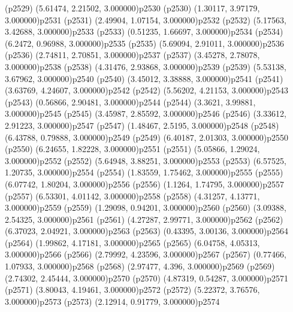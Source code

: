 \psdot(p2529)
\psPoint(5.61474, 2.21502, 3.000000){p2530}
\psdot(p2530)
\psPoint(1.30117, 3.97179, 3.000000){p2531}
\psdot(p2531)
\psPoint(2.49904, 1.07154, 3.000000){p2532}
\psdot(p2532)
\psPoint(5.17563, 3.42688, 3.000000){p2533}
\psdot(p2533)
\psPoint(0.51235, 1.66697, 3.000000){p2534}
\psdot(p2534)
\psPoint(6.2472, 0.96988, 3.000000){p2535}
\psdot(p2535)
\psPoint(5.69094, 2.91011, 3.000000){p2536}
\psdot(p2536)
\psPoint(2.74811, 2.70851, 3.000000){p2537}
\psdot(p2537)
\psPoint(3.45278, 2.78078, 3.000000){p2538}
\psdot(p2538)
\psPoint(4.31476, 2.93868, 3.000000){p2539}
\psdot(p2539)
\psPoint(5.53138, 3.67962, 3.000000){p2540}
\psdot(p2540)
\psPoint(3.45012, 3.38888, 3.000000){p2541}
\psdot(p2541)
\psPoint(3.63769, 4.24607, 3.000000){p2542}
\psdot(p2542)
\psPoint(5.56202, 4.21153, 3.000000){p2543}
\psdot(p2543)
\psPoint(0.56866, 2.90481, 3.000000){p2544}
\psdot(p2544)
\psPoint(3.3621, 3.99881, 3.000000){p2545}
\psdot(p2545)
\psPoint(3.45987, 2.85592, 3.000000){p2546}
\psdot(p2546)
\psPoint(3.33612, 2.91223, 3.000000){p2547}
\psdot(p2547)
\psPoint(1.48467, 2.5195, 3.000000){p2548}
\psdot(p2548)
\psPoint(6.43788, 0.79888, 3.000000){p2549}
\psdot(p2549)
\psPoint(6.40187, 2.01303, 3.000000){p2550}
\psdot(p2550)
\psPoint(6.24655, 1.82228, 3.000000){p2551}
\psdot(p2551)
\psPoint(5.05866, 1.29024, 3.000000){p2552}
\psdot(p2552)
\psPoint(5.64948, 3.88251, 3.000000){p2553}
\psdot(p2553)
\psPoint(6.57525, 1.20735, 3.000000){p2554}
\psdot(p2554)
\psPoint(1.83559, 1.75462, 3.000000){p2555}
\psdot(p2555)
\psPoint(6.07742, 1.80204, 3.000000){p2556}
\psdot(p2556)
\psPoint(1.1264, 1.74795, 3.000000){p2557}
\psdot(p2557)
\psPoint(6.53301, 4.01142, 3.000000){p2558}
\psdot(p2558)
\psPoint(4.31257, 4.13771, 3.000000){p2559}
\psdot(p2559)
\psPoint(1.29098, 0.94201, 3.000000){p2560}
\psdot(p2560)
\psPoint(3.09388, 2.54325, 3.000000){p2561}
\psdot(p2561)
\psPoint(4.27287, 2.99771, 3.000000){p2562}
\psdot(p2562)
\psPoint(6.37023, 2.04921, 3.000000){p2563}
\psdot(p2563)
\psPoint(0.43395, 3.00136, 3.000000){p2564}
\psdot(p2564)
\psPoint(1.99862, 4.17181, 3.000000){p2565}
\psdot(p2565)
\psPoint(6.04758, 4.05313, 3.000000){p2566}
\psdot(p2566)
\psPoint(2.79992, 4.23596, 3.000000){p2567}
\psdot(p2567)
\psPoint(0.77466, 1.07933, 3.000000){p2568}
\psdot(p2568)
\psPoint(2.97477, 4.396, 3.000000){p2569}
\psdot(p2569)
\psPoint(2.74302, 2.45444, 3.000000){p2570}
\psdot(p2570)
\psPoint(4.87319, 0.54287, 3.000000){p2571}
\psdot(p2571)
\psPoint(3.80043, 4.19461, 3.000000){p2572}
\psdot(p2572)
\psPoint(5.22372, 3.76576, 3.000000){p2573}
\psdot(p2573)
\psPoint(2.12914, 0.91779, 3.000000){p2574}
